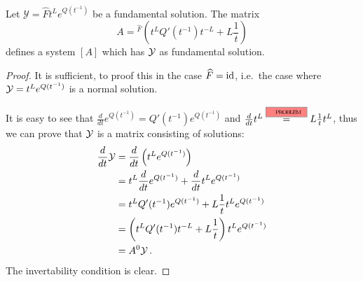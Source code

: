 \begin{prop}\label{prop:fundSolBuilder}
  Let $\mathcal{Y}=\hat F t^L e^{Q(t^{-1})}$ be a fundamental solution.
  The matrix
  \[
    A={}^{\hat F}\left(t^LQ'(t^{-1})t^{-L}+L\frac{1}{t}\right)
  \]
  defines a system $[A]$ which has $\mathcal{Y}$ as fundamental solution.
\end{prop}
\begin{proof}
  It is sufficient, to proof this in the case $\widehat F=\operatorname{id}$, i.e.\ the case
  where $\mathcal{Y}=t^L e^{Q(t^{-1})}$ is a normal solution.

  \begin{comment}
    Since we are dealing with diagonal matrices it is easy to see that
    \begin{align*}
      \frac{d}{dt}e^{Q(t^{-1})}
      &=\diag\left(\frac{d}{dt}e^{q_1(t^{-1})},\frac{d}{dt}e^{q_2(t^{-1})}
        ,\dots,
        \frac{d}{dt}e^{q_n(t^{-1})}\right)
        \\&=\diag\left(\frac{d}{dt}q_1(t^{-1})e^{q_1(t^{-1})}
                      ,\frac{d}{dt}q_1(t^{-1})e^{q_2(t^{-1})}
                      ,\dots
                      ,\frac{d}{dt}q_1(t^{-1})e^{q_n(t^{-1})}\right)
    \\&=Q'(t^{-1})e^{Q(t^{-1})} \,.
    \end{align*}
    and, since the function $t^L$ is defined as $e^{L\ln t}$,
    \begin{align*}
      \frac{d}{dt}t^L&=\frac{d}{dt}e^{L\ln t}
      =Le^{(L-\id)\ln t}
      =L\frac{1}{t}t^L \,.
    \end{align*}
  \end{comment}
  It is easy to see that $\frac{d}{dt}e^{Q(t^{-1})}=Q'(t^{-1})e^{Q(t^{-1})}$
  and $\frac{d}{dt}t^L\overset{\PROBLEM}{=}L\frac{1}{t}t^L$, thus we can prove
  that $\mathcal{Y}$ is a matrix consisting of solutions:
  \begin{align*}
    \frac{d}{dt}\mathcal{Y}
    &=\frac{d}{dt}\left(t^Le^{Q(t^{-1})}\right)
  \\&= t^L\frac{d}{dt}e^{Q(t^{-1})} + \frac{d}{dt}t^Le^{Q(t^{-1})}
  \\&= t^LQ'(t^{-1})e^{Q(t^{-1})} + L\frac{1}{t}t^Le^{Q(t^{-1})}
  \\&=\left(t^LQ'(t^{-1})t^{-L}+L\frac{1}{t}\right)t^Le^{Q(t^{-1})}
  \\&=A^0\mathcal{Y} \,.
  \end{align*}
  The invertability condition is clear.
\end{proof}
